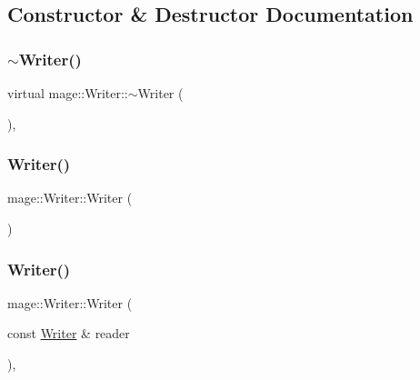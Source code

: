 \subsection{Constructor \& Destructor Documentation}
\hypertarget{classmage_1_1_writer_a04fe27246806384099d518231c75c09f}{}\label{classmage_1_1_writer_a04fe27246806384099d518231c75c09f} 
\subsubsection{\texorpdfstring{$\sim$\+Writer()}{~Writer()}}
{\footnotesize\ttfamily virtual mage\+::\+Writer\+::$\sim$\+Writer (\begin{DoxyParamCaption}{ }\end{DoxyParamCaption})\hspace{0.3cm}{\ttfamily [virtual]}, {\ttfamily [default]}}

\hypertarget{classmage_1_1_writer_a40b6cd3005d509e670c5a49272d9ef27}{}\label{classmage_1_1_writer_a40b6cd3005d509e670c5a49272d9ef27} 
\subsubsection{\texorpdfstring{Writer()}{Writer()}\hspace{0.1cm}{\footnotesize\ttfamily [1/3]}}
{\footnotesize\ttfamily mage\+::\+Writer\+::\+Writer (\begin{DoxyParamCaption}{ }\end{DoxyParamCaption})\hspace{0.3cm}{\ttfamily [protected]}}

\hypertarget{classmage_1_1_writer_a0988d427f687ad5334c2ba74993e0d6e}{}\label{classmage_1_1_writer_a0988d427f687ad5334c2ba74993e0d6e} 
\subsubsection{\texorpdfstring{Writer()}{Writer()}\hspace{0.1cm}{\footnotesize\ttfamily [2/3]}}
{\footnotesize\ttfamily mage\+::\+Writer\+::\+Writer (\begin{DoxyParamCaption}\item[{const \hyperlink{classmage_1_1_writer}{Writer} \&}]{reader }\end{DoxyParamCaption})\hspace{0.3cm}{\ttfamily [protected]}, {\ttfamily [delete]}}

